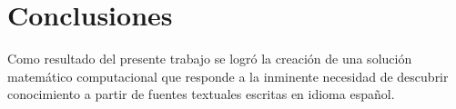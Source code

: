 \chapter*{Conclusiones}\label{chapter:conclusion}

Como resultado del presente trabajo se logró la creación de una solución matemático computacional que responde a la inminente necesidad de descubrir conocimiento a partir de fuentes textuales escritas en idioma español.